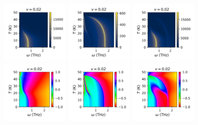 \documentclass[a4paper]{article}
\begin{document}
\begin{figure}[H]
  \centering
  \includegraphics[width=0.3\textwidth]{v1-g1_abs.png}
  \includegraphics[width=0.3\textwidth]{v1-g2_abs.png}
  \includegraphics[width=0.3\textwidth]{v1-g3_abs.png}
  \includegraphics[width=0.3\textwidth]{v1-g1_phase.png}
  \includegraphics[width=0.3\textwidth]{v1-g2_phase.png}
  \includegraphics[width=0.3\textwidth]{v1-g3_phase.png}
\end{figure}
\end{document}
